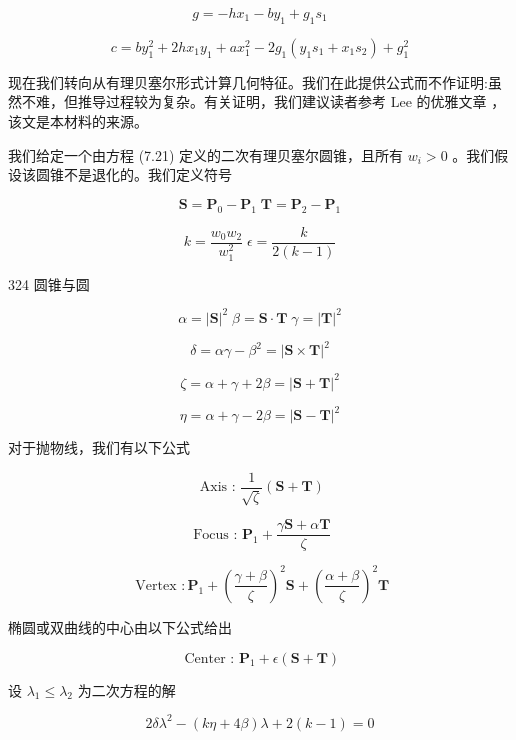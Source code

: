 \documentclass[../main.tex]{subfiles}
\begin{document}
\[
g =  - h{x}_{1} - b{y}_{1} + {g}_{1}{s}_{1}
\]

\[
c = b{y}_{1}^{2} + {2h}{x}_{1}{y}_{1} + a{x}_{1}^{2} - 2{g}_{1}\left( {{y}_{1}{s}_{1} + {x}_{1}{s}_{2}}\right)  + {g}_{1}^{2} \tag{7.57}
\]

现在我们转向从有理贝塞尔形式计算几何特征。我们在此提供公式而不作证明:虽然不难，但推导过程较为复杂。有关证明，我们建议读者参考 Lee 的优雅文章 \cite{Lee87}，该文是本材料的来源。

我们给定一个由方程 (7.21) 定义的二次有理贝塞尔圆锥，且所有 \({w}_{i} > 0\) 。我们假设该圆锥不是退化的。我们定义符号

\[
\mathbf{S} = {\mathbf{P}}_{0} - {\mathbf{P}}_{1}\;\mathbf{T} = {\mathbf{P}}_{2} - {\mathbf{P}}_{1}
\]

\[
k = \frac{{w}_{0}{w}_{2}}{{w}_{1}^{2}}\;\epsilon  = \frac{k}{2\left( {k - 1}\right) }
\]

324 圆锥与圆

\[
\alpha  = {\left| \mathbf{S}\right| }^{2}\;\beta  = \mathbf{S} \cdot  \mathbf{T}\;\gamma  = {\left| \mathbf{T}\right| }^{2}
\]

\[
\delta  = {\alpha \gamma } - {\beta }^{2} = {\left| \mathbf{S} \times  \mathbf{T}\right| }^{2}
\]

\[
\zeta  = \alpha  + \gamma  + {2\beta } = {\left| \mathbf{S} + \mathbf{T}\right| }^{2}
\]

\[
\eta  = \alpha  + \gamma  - {2\beta } = {\left| \mathbf{S} - \mathbf{T}\right| }^{2}
\]

对于抛物线，我们有以下公式

\[
\text{ Axis : }\frac{1}{\sqrt{\zeta }}\left( {\mathbf{S} + \mathbf{T}}\right)  \tag{7.58}
\]

\[
\text{ Focus : }{\mathbf{P}}_{1} + \frac{\gamma \mathbf{S} + \alpha \mathbf{T}}{\zeta } \tag{7.59}
\]

\[
\text{ Vertex } : {\mathbf{P}}_{1} + {\left( \frac{\gamma  + \beta }{\zeta }\right) }^{2}\mathbf{S} + {\left( \frac{\alpha  + \beta }{\zeta }\right) }^{2}\mathbf{T} \tag{7.60}
\]

椭圆或双曲线的中心由以下公式给出

\[
\text{ Center : }{\mathbf{P}}_{1} + \epsilon \left( {\mathbf{S} + \mathbf{T}}\right)  \tag{7.61}
\]

设 \({\lambda }_{1} \leq  {\lambda }_{2}\) 为二次方程的解

\[
{2\delta }{\lambda }^{2} - \left( {{k\eta } + {4\beta }}\right) \lambda  + 2\left( {k - 1}\right)  = 0
\]
\end{document}
